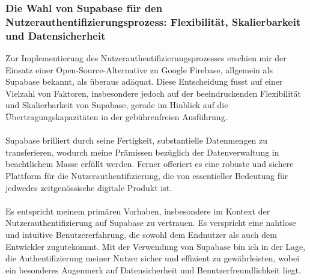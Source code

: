 \subsubsection{Die Wahl von Supabase für den Nutzerauthentifizierungsprozess: Flexibilität, Skalierbarkeit und Datensicherheit}
Zur Implementierung des Nutzerauthentifizierungsprozesses erschien mir der Einsatz einer Open-Source-Alternative zu Google Firebase, allgemein als Supabase bekannt, als überaus adäquat. Diese Entscheidung fusst auf einer Vielzahl von Faktoren, insbesondere jedoch auf der beeindruckenden Flexibilität und Skalierbarkeit von Supabase, gerade im Hinblick auf die Übertragungskapazitäten in der gebührenfreien Ausführung.\\\\
Supabase brilliert durch seine Fertigkeit, substantielle Datenmengen zu transferieren, wodurch meine Prämissen bezüglich der Datenverwaltung in beachtlichem Masse erfüllt werden. Ferner offeriert es eine robuste und sichere Plattform für die Nutzerauthentifizierung, die von essentieller Bedeutung für jedwedes zeitgenössische digitale Produkt ist.\\\\
Es entspricht meinem primären Vorhaben, insbesondere im Kontext der Nutzerauthentifizierung auf Supabase zu vertrauen. Es verspricht eine nahtlose und intuitive Benutzererfahrung, die sowohl dem Endnutzer als auch dem Entwickler zugutekommt. Mit der Verwendung von Supabase bin ich in der Lage, die Authentifizierung meiner Nutzer sicher und effizient zu gewährleisten, wobei ein besonderes Augenmerk auf Datensicherheit und Benutzerfreundlichkeit liegt.
